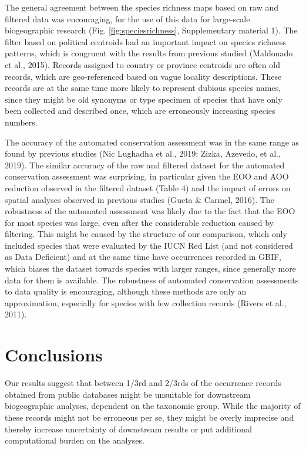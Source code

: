 \documentclass[
  12pt,
]{article}
\begin{document}
The general agreement between the species richness maps based on raw and filtered data was encouraging, for the use of this data for large-scale biogeographic research (Fig. \ref{fig:speciesrichness}, Supplementary material 1). The filter based on political centroids had an important impact on species richness patterns, which is congruent with the results from previous studied (Maldonado et al., 2015). Records assigned to country or province centroids are often old records, which are geo-referenced based on vague locality descriptions. These records are at the same time more likely to represent dubious species names, since they might be old synonyms or type specimen of species that have only been collected and described once, which are erroneously increasing species numbers.

The accuracy of the automated conservation assessment was in the same range as found by previous studies (Nic Lughadha et al., 2019; Zizka, Azevedo, et al., 2019). The similar accuracy of the raw and filtered dataset for the automated conservation assessment was surprising, in particular given the EOO and AOO reduction observed in the filtered dataset (Table 4) and the impact of errors on spatial analyses observed in previous studies (Gueta \& Carmel, 2016). The robustness of the automated assessment was likely due to the fact that the EOO for most species was large, even after the considerable reduction caused by filtering. This might be caused by the structure of our comparison, which only included species that were evaluated by the IUCN Red List (and not considered as Data Deficient) and at the same time have occurrences recorded in GBIF, which biases the dataset towards species with larger ranges, since generally more data for them is available. The robustness of automated conservation assessments to data quality is encouraging, although these methods are only an approximation, especially for species with few collection records (Rivers et al., 2011).

\hypertarget{conclusions}{%
\section{Conclusions}\label{conclusions}}

Our results suggest that between 1/3rd and 2/3rds of the occurrence records obtained from public databases might be unsuitable for downstream biogeographic analyses, dependent on the taxonomic group. While the majority of these records might not be erroneous per se, they might be overly imprecise and thereby increase uncertainty of downstream results or put additional computational burden on the analyses.
\end{document}
